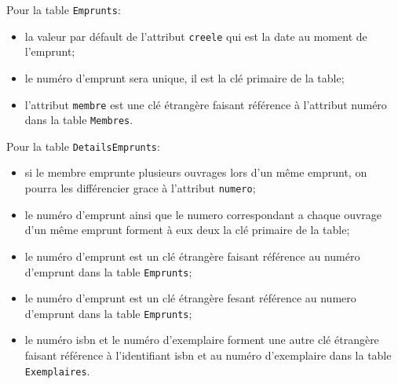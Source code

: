 \documentclass[10pt, oneside]{article}
\begin{document}
Pour la table \texttt{Emprunts}: 
\begin{itemize}
\item la valeur par défault de l'attribut \texttt{creele} qui est la date au moment de l'emprunt;
\item le numéro d'emprunt sera unique, il est la clé primaire de la table;
\item l'attribut \texttt{membre} est une clé étrangère faisant référence à l'attribut numéro dans la table \texttt{Membres}.
\end{itemize}

Pour la table \texttt{DetailsEmprunts}: 
\begin{itemize}
\item si le membre emprunte plusieurs ouvrages lors d'un même emprunt, on pourra les différencier grace à l'attribut \texttt{numero};
\item le numéro d'emprunt ainsi que le numero correspondant a chaque ouvrage d'un même emprunt forment à eux deux la clé primaire de la table;
\item le numéro d'emprunt est un clé étrangère faisant référence au numéro d'emprunt dans la table \texttt{Emprunts};
\item le numéro d'emprunt est un clé étrangère fesant référence au numero d'emprunt dans la table \texttt{Emprunts};
\item le numéro isbn et le numéro d'exemplaire forment une autre clé étrangère faisant référence à l'identifiant isbn et au numéro d'exemplaire dans la table \texttt{Exemplaires}.
\end{itemize}
\end{document}
